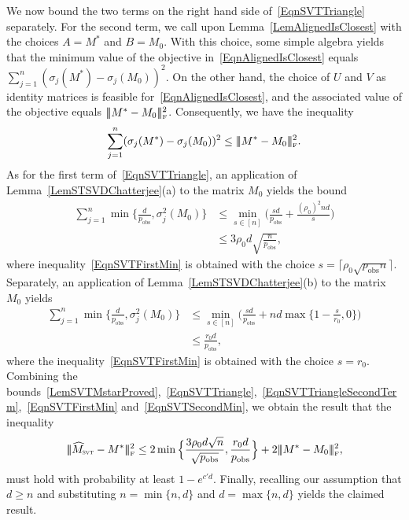 \documentclass[11pt, hidelinks]{article} %
\newcommand{\singularvalue}[2]{\sigma_{#1}(#2)}
\newcommand{\matsnorm}[2]{|\!|\!| #1 | \! | \!|_{{#2}}}
\newcommand{\frobnorm}[1]{\ensuremath{\matsnorm{#1}{\mbox{\tiny{F}}}}}
\newcommand{\numrows}{n}
\newcommand{\numcols}{d}
\newcommand{\plaincon}{c}
\newcommand{\wtmatrix}{M}
\newcommand{\wt}{\wtmatrix}
\newcommand{\wtstar}{\wtmatrix^*}
\newcommand{\wthat}{\widehat{\wtmatrix}}
\newcommand{\pp}{\ensuremath{p_{\mathrm{obs}}}}
\newcommand{\nnrank}{r}
\newcommand{\permrank}{\rho}
\newcommand{\wtclosest}{\ensuremath{\wt_0}}
\newcommand{\mxtempone}{A}
\newcommand{\mxtemptwo}{B}
\newcommand{\mxU}{U}
\newcommand{\mxV}{V}
\newcommand{\wthatSVT}{\wthat_{\mbox{\scalebox{.5}{SVT}}}}
\begin{document}
We now bound the two terms on the right hand side of~\eqref{EqnSVTTriangle} separately. For the second term, we call upon Lemma~\ref{LemAlignedIsClosest} with the choices $\mxtempone = \wtstar$ and $\mxtemptwo = \wtclosest$. With this choice, some simple algebra yields that the minimum value of the objective in~\eqref{EqnAlignedIsClosest} equals $\sum_{j=1}^{\numrows} ( \singularvalue{j}{\wtstar} - \singularvalue{j}{\wtclosest} )^2$. On the other hand, the choice of $\mxU$ and $\mxV$ as identity matrices is feasible for~\eqref{EqnAlignedIsClosest}, and the associated value of the objective equals $\frobnorm{\wtstar -\wtclosest}^2$. Consequently, we have the inequality
\begin{align}
\sum_{j=1}^{\numrows} ( \singularvalue{j}{\wtstar} - \singularvalue{j}{\wtclosest} )^2 \leq \frobnorm{\wtstar -\wtclosest}^2.
\label{EqnSVTTriangleSecondTerm}
\end{align}
As for the first term of~\eqref{EqnSVTTriangle}, an application of Lemma~\ref{LemSTSVDChatterjee}(a) to the matrix $\wtclosest$ yields the bound 
\begin{align}
\sum_{j=1}^\numrows
\min \big \{ \frac{\numcols}{\pp}, \sigma_j^2(\wtclosest) \big \}
 & \leq  \min_{s \in
  [\numrows]} \big( \frac{s \numcols}{\pp} + \frac{(\permrank_0)^2
  \numrows \numcols}{s} \big) \nonumber \\
&  \leq 3 \permrank_0 \numcols  \sqrt{\frac{\numrows}{\pp} }, \label{EqnSVTFirstMin}
\end{align}
where inequality~\eqref{EqnSVTFirstMin} is obtained with the choice $s =
\lceil \permrank_0 \sqrt{\pp \numrows} \rceil$. 
Separately, an application of Lemma~\ref{LemSTSVDChatterjee}(b) to the matrix $\wtclosest$ yields
\begin{align}
\sum_{j=1}^\numrows
\min \big \{ \frac{\numcols}{\pp}, \sigma_j^2(\wtclosest) \big \} & \leq \min_{s \in
  [\numrows]} \big( \frac{s \numcols}{\pp} + \numrows \numcols
\max\big\{ 1 - \frac{s}{\nnrank_0}, 0\big\} \big) \nonumber \\
& \leq \frac{\nnrank_0 \numcols }{\pp }, \label{EqnSVTSecondMin}
\end{align}
where  the inequality~\eqref{EqnSVTFirstMin} is obtained with the choice $s = \nnrank_0$. Combining the bounds~\eqref{LemSVTMstarProved},~\eqref{EqnSVTTriangle},~\eqref{EqnSVTTriangleSecondTerm},~\eqref{EqnSVTFirstMin} and~\eqref{EqnSVTSecondMin}, we obtain the result that the inequality
\begin{align*}
\frobnorm{\wthatSVT - \wtstar}^2 \leq 2 \min\Big\{ \frac{3 \permrank_0 \numcols  \sqrt{\numrows} } {\sqrt{\pp} } , \frac{\nnrank_0 \numcols }{\pp  }  \Big\} + 2\frobnorm{\wtstar -\wtclosest}^2, 
\end{align*}
must hold with probability at least $1 - e^{\plaincon' \numcols}$.  Finally, recalling our assumption that $\numcols \geq \numrows$ and
substituting $\numrows = \min \{\numrows, \numcols\}$ and $\numcols =
\max \{ \numrows, \numcols \}$ yields the claimed result.
\end{document}
